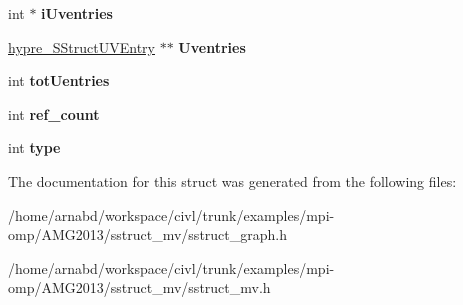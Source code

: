 \begin{DoxyCompactItemize}
\item 
\hypertarget{structhypre__SStructGraph__struct_a6d177a02749e54b5551e6f0fe36da6d6}{}int $\ast$ {\bfseries i\+Uventries}\label{structhypre__SStructGraph__struct_a6d177a02749e54b5551e6f0fe36da6d6}

\item 
\hypertarget{structhypre__SStructGraph__struct_af45a236201b0cc2ffdd3afde2fccb0e1}{}\hyperlink{structhypre__SStructUVEntry}{hypre\+\_\+\+S\+Struct\+U\+V\+Entry} $\ast$$\ast$ {\bfseries Uventries}\label{structhypre__SStructGraph__struct_af45a236201b0cc2ffdd3afde2fccb0e1}

\item 
\hypertarget{structhypre__SStructGraph__struct_a582fa9756dac66cb2e2225e7c0ddf5e4}{}int {\bfseries tot\+Uentries}\label{structhypre__SStructGraph__struct_a582fa9756dac66cb2e2225e7c0ddf5e4}

\item 
\hypertarget{structhypre__SStructGraph__struct_a3c5b61d010adaf19b185d2d89f6769a6}{}int {\bfseries ref\+\_\+count}\label{structhypre__SStructGraph__struct_a3c5b61d010adaf19b185d2d89f6769a6}

\item 
\hypertarget{structhypre__SStructGraph__struct_a9c0e6e99c11b166999848c7ae0297711}{}int {\bfseries type}\label{structhypre__SStructGraph__struct_a9c0e6e99c11b166999848c7ae0297711}

\end{DoxyCompactItemize}


The documentation for this struct was generated from the following files\+:\begin{DoxyCompactItemize}
\item 
/home/arnabd/workspace/civl/trunk/examples/mpi-\/omp/\+A\+M\+G2013/sstruct\+\_\+mv/sstruct\+\_\+graph.\+h\item 
/home/arnabd/workspace/civl/trunk/examples/mpi-\/omp/\+A\+M\+G2013/sstruct\+\_\+mv/sstruct\+\_\+mv.\+h\end{DoxyCompactItemize}
